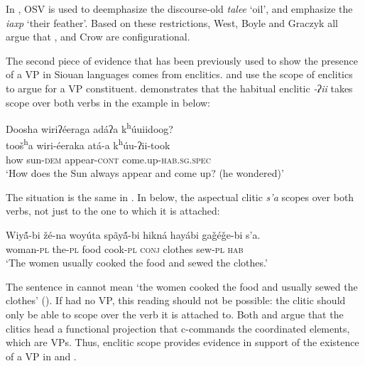 \documentclass[output=paper]{LSP/langsci}
\begin{document}
In , OSV  is used to deemphasize the discourse-old  \textit{talee} `oil', and emphasize the  \textit{iaxp} `their feather'.  Based on these  restrictions, West, Boyle and Graczyk all argue that ,  and Crow are configurational. 
	
The second piece of evidence that has been previously used to show the presence of a VP in Siouan languages comes from enclitics. \citet{West2003} and \citet{Boyle2007} use the scope of enclitics to argue for a VP constituent. \citet{Boyle2007} demonstrates that the  habitual enclitic \textit{-ʔii} takes scope over both verbs in the example in  below:


\let\eachwordtwo=\itshape
\begin{exe}
\ex\label{ex:jrs:27} 
\glll Doosha	wiriʔéeraga 	adáʔa 	 k\textsuperscript{h}\'uuiidoog?\\
too\v{s}\textsuperscript{h}a 	wiri-éeraka 	atá-a k\textsuperscript{h}\'uu-ʔii-took \\
how 	sun-\textsc{dem} 	appear-\textsc{cont}  come.up-\textsc{hab.sg.spec} \\
\trans `How does the Sun always appear and come up? (he wondered)' \citep[223]{Boyle2007}
\end{exe}

The situation is the same in .  In  below, the aspectual clitic \textit{s'a} scopes over both verbs, not just to the one to which it is attached:

\begin{exe}
\ex\label{ex:jrs:28} \gll Wiy\'{ã}-bi 		\v{z}é-na 	woy\'uta 	spãy\'{ã}-bi 	hikná 	hayábi 		ga\v{g}é\v{g}e-bi 	s'a. \\
woman-\textsc{pl} the-\textsc{pl} 	food 	cook-\textsc{pl} \textsc{conj} 	clothes 	sew-\textsc{pl} 	\textsc{hab} \\
\trans `The women usually cooked the food and sewed the clothes.' \citep[39]{West2003}
\end{exe}

The sentence in  cannot mean `the women cooked the food and usually sewed the clothes' (\citealt{West2003}).  If  had no VP, this reading should not be possible: the clitic should only be able to scope over the verb it is attached to. Both \citet{Boyle2007} and \citet{West2003} argue that the clitics head a functional projection that c-commands the coordinated elements, which are VPs.  Thus, enclitic scope provides evidence in support of the existence of a VP in  and .
	
\end{document}
